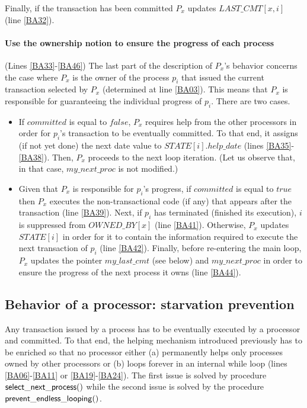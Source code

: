 Finally, if the transaction has been committed
$P_x$ updates  $\mathit{LAST\_CMT}[x,i]$  (line \ref{BA32}).


\paragraph{Use the ownership notion to ensure the progress of each process} 
(Lines \ref{BA33}-\ref{BA46}) 
The last part of the description of $P_x$'s behavior  concerns the 
case where  $P_x$ is the owner of the process $p_i$ that issued the 
current transaction selected by $P_x$ (determined at line \ref{BA03}). 
This means that $P_x$ is responsible for guaranteeing the individual 
progress of $p_i$.  There are two cases. 
%
\begin{itemize}
\item
If $committed$ is  equal to $\mathit{false}$, $P_x$ requires help 
from the other processors in order for $p_i$'s transaction to be eventually 
committed. To that end, it assigns (if not yet done) the next date value 
to $\mathit{STATE}[i].help\_date$  (lines \ref{BA35}-\ref{BA38}). 
Then, $P_x$ proceeds to  the next loop iteration.
(Let us observe that, in that case, $my\_next\_proc$ is not  modified.)
%
\item
Given that $P_x$ is responsible for  $p_i$'s progress, 
if $committed$ is  equal to $\mathit{true}$ then $P_x$ executes the  non-transactional code
(if any) that appears after the transaction (line \ref{BA39}).
Next, if  $p_i$ has terminated (finished its execution), $i$ is suppressed from $\mathit{OWNED\_BY}[x]$
(line \ref{BA41}). Otherwise, $P_x$ updates $\mathit{STATE}[i]$ in order for it 
to contain the information required to execute the next transaction of $p_i$ 
(line \ref{BA42}). 
%
Finally, before re-entering the main loop, $P_x$ 
updates the pointer  $my\_last\_cmt$ (see below) and 
$my\_next\_proc$ in order to ensure the progress of the next 
process it owns (line \ref{BA44}). 
\end{itemize}

\subsection{Behavior of a processor:  starvation prevention}
\label{sec:starvation-prevention}

Any transaction issued by a process has to be eventually executed 
by  a processor and  committed. 
To that end, the helping mechanism introduced previously has 
 to be enriched so that  no processor either (a) permanently helps  only
 processes owned by other processors or (b) loops forever in an internal 
while loop (lines \ref{BA06}-\ref{BA11} or \ref{BA19}-\ref{BA24}).
The first issue is solved by  procedure ${\sf select\_next\_process}()$
while the second issue is solved by the procedure 
${\sf prevent\_endless\_looping}()$.  

